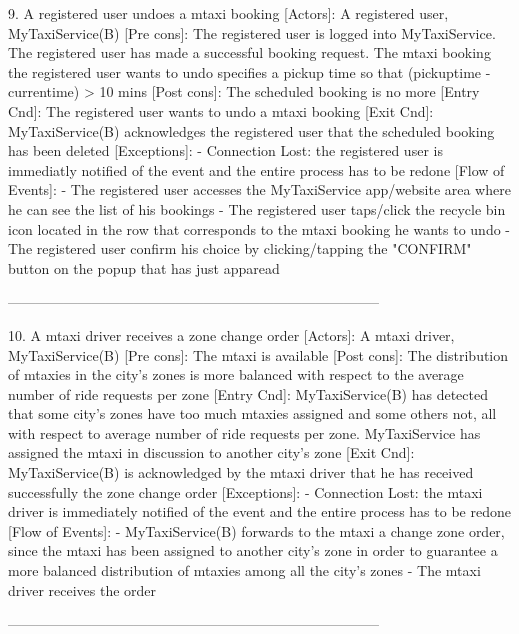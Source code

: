 \documentclass[11pt]{article} %
\begin{document}
      9. A registered user undoes a mtaxi booking
        [Actors]: A registered user, MyTaxiService(B)
        [Pre cons]: The registered user is logged into MyTaxiService. The registered user
        has made a successful booking request. The mtaxi booking the registered user wants to undo
        specifies a pickup time so that (pickuptime - currentime) > 10 mins
        [Post cons]: The scheduled booking is no more
        [Entry Cnd]: The registered user wants to undo a mtaxi booking
        [Exit Cnd]: MyTaxiService(B) acknowledges the registered user that the scheduled booking
        has been deleted
        [Exceptions]:
          - Connection Lost: the registered user is immediatly notified of the event and the entire process
          has to be redone
        [Flow of Events]:
          - The registered user accesses the MyTaxiService app/website area where he can see the list of his bookings
          - The registered user taps/click the recycle bin icon located in the row that corresponds to the mtaxi booking
          he wants to undo
          - The registered user confirm his choice by clicking/tapping the "CONFIRM" button on
          the popup that has just apparead

      --------------------------------------------------------------------------------

      10. A mtaxi driver receives a zone change order
        [Actors]: A mtaxi driver, MyTaxiService(B)
        [Pre cons]: The mtaxi is available
        [Post cons]: The distribution of mtaxies in the city's zones is more balanced
        with respect to the average number of ride requests per zone
        [Entry Cnd]: MyTaxiService(B) has detected that some city's zones have too much mtaxies assigned
        and some others not, all with respect to average number of ride requests per zone. MyTaxiService
        has assigned the mtaxi in discussion to another city's zone
        [Exit Cnd]: MyTaxiService(B) is acknowledged by the mtaxi driver that he has received successfully
        the zone change order
        [Exceptions]:
          - Connection Lost: the mtaxi driver is immediately notified of the event and the entire process has to be redone
        [Flow of Events]:
          - MyTaxiService(B) forwards to the mtaxi a change zone order, since the mtaxi has been assigned to another city's zone in order to guarantee
          a more balanced distribution of mtaxies among all the city's zones
          - The mtaxi driver receives the order

      --------------------------------------------------------------------------------
\end{document}
